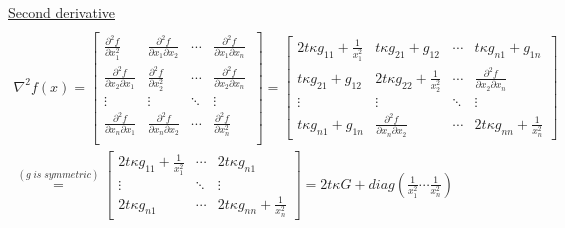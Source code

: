 \documentclass[fleqn]{article}
\begin{document}
\underline{Second derivative}\\
\begin{multline*} \\
\nabla^2 f(x) = \begin{bmatrix} 
\frac{\partial^2 f}{\partial x_1^2} & \frac{\partial^2 f}{\partial x_1 \partial x_2} & \cdots & \frac{\partial^2 f}{\partial x_1 \partial x_n}\
\\ 
\frac{\partial^2 f}{\partial x_2 \partial x_1} & \frac{\partial^2 f}{\partial x_2^2} & \cdots & \frac{\partial^2 f}{\partial x_2 \partial x_n}
\\ 
\vdots & \vdots & \ddots & \vdots
\\ 
\frac{\partial^2 f}{\partial x_n \partial x_1} & \frac{\partial^2 f}{\partial x_n \partial x_2} & \cdots & \frac{\partial^2 f}{\partial x_n^2}
\\ 
				\end{bmatrix}
=
\begin{bmatrix} 
	2t \kappa g_{11} + \frac{1}{x_1^2} &
	t \kappa g_{21} + g_{12}           & \cdots &
	t \kappa g_{n1} + g_{1n}
		\\ 
	t \kappa g_{21} + g_{12}           &
	2t \kappa g_{22} + \frac{1}{x_2^2} & \cdots &
	\frac{\partial^2 f}{\partial x_2 \partial 	x_n}
		\\ 
	\vdots & \vdots & \ddots & \vdots
	\\ 
	t \kappa g_{n1} + g_{1n} & \frac{\partial^2 f}		{\partial x_n \partial x_2} & \cdots & 2t \kappa g_{nn} + \frac{1}{x_n^2}
\end{bmatrix} \\
\stackrel{(g \; is \; symmetric)}{=}
\begin{bmatrix} 
	2t \kappa g_{11} + \frac{1}{x_1^2} & \cdots &
	2t \kappa g_{n1}
		\\ 
	\vdots &  \ddots & \vdots
		\\ 
	2t \kappa g_{n1} &  \cdots & 2t \kappa g_{nn} + \frac{1}{x_n^2}
\end{bmatrix}
=2t \kappa G + diag(\frac{1}{x_1^2} \cdots \frac{1}{x_n^2})
\end{multline*} \\ \\
\end{document}
